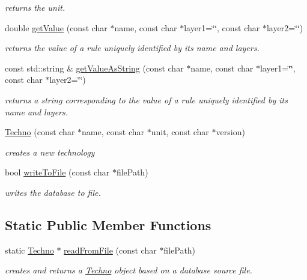 \begin{DoxyCompactItemize}
\begin{DoxyCompactList}\small\item\em returns the unit. \end{DoxyCompactList}\item 
double \hyperlink{class_d_t_r_1_1_techno_ac08e2e60dd16750551221ca908001057}{get\-Value} (const char $\ast$name, const char $\ast$layer1=\char`\"{}\char`\"{}, const char $\ast$layer2=\char`\"{}\char`\"{})
\begin{DoxyCompactList}\small\item\em returns the value of a rule uniquely identified by its name and layers. \end{DoxyCompactList}\item 
const std\-::string \& \hyperlink{class_d_t_r_1_1_techno_ad5ef5b8e444ab7a86a2e3bff7762c956}{get\-Value\-As\-String} (const char $\ast$name, const char $\ast$layer1=\char`\"{}\char`\"{}, const char $\ast$layer2=\char`\"{}\char`\"{})
\begin{DoxyCompactList}\small\item\em returns a string corresponding to the value of a rule uniquely identified by its name and layers. \end{DoxyCompactList}\item 
\hyperlink{class_d_t_r_1_1_techno_a25c6aecdd011d09618908626192c933f}{Techno} (const char $\ast$name, const char $\ast$unit, const char $\ast$version)
\begin{DoxyCompactList}\small\item\em creates a new technology \end{DoxyCompactList}\item 
bool \hyperlink{class_d_t_r_1_1_techno_a26b05539dd3345963b8708788b82e2cb}{write\-To\-File} (const char $\ast$file\-Path)
\begin{DoxyCompactList}\small\item\em writes the database to file. \end{DoxyCompactList}\end{DoxyCompactItemize}
\subsection*{Static Public Member Functions}
\begin{DoxyCompactItemize}
\item 
static \hyperlink{class_d_t_r_1_1_techno}{Techno} $\ast$ \hyperlink{class_d_t_r_1_1_techno_acf863c2bdb7f1aacc4422c8155c60d17}{read\-From\-File} (const char $\ast$file\-Path)
\begin{DoxyCompactList}\small\item\em creates and returns a \hyperlink{class_d_t_r_1_1_techno}{Techno} object based on a database source file. \end{DoxyCompactList}\end{DoxyCompactItemize}


